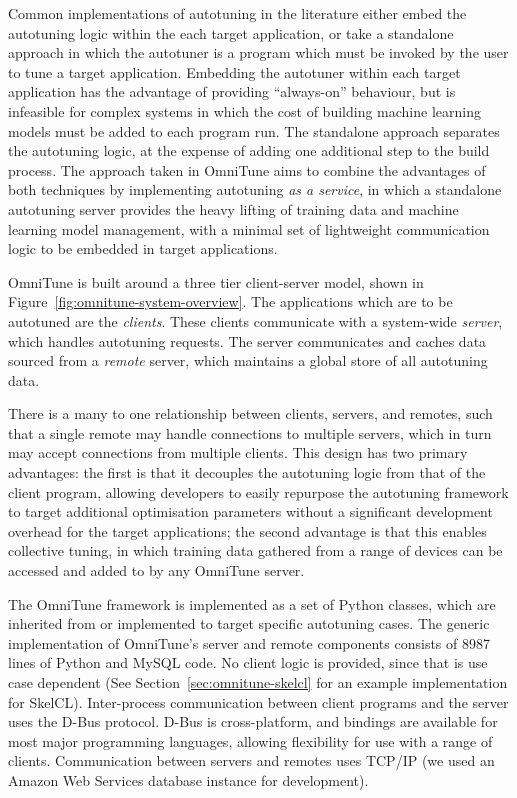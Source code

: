 \documentclass[nonatbib,preprint,9pt]{sigplanconf}
\begin{document}
Common implementations of autotuning in the literature either embed
the autotuning logic within the each target application, or take a
standalone approach in which the autotuner is a program which must be
invoked by the user to tune a target application. Embedding the
autotuner within each target application has the advantage of
providing ``always-on'' behaviour, but is infeasible for complex
systems in which the cost of building machine learning models must be
added to each program run. The standalone approach separates the
autotuning logic, at the expense of adding one additional step to the
build process. The approach taken in OmniTune aims to combine the
advantages of both techniques by implementing autotuning \emph{as a
  service}, in which a standalone autotuning server provides the heavy
lifting of training data and machine learning model management, with a
minimal set of lightweight communication logic to be embedded in
target applications.

OmniTune is built around a three tier client-server model, shown in
Figure~\ref{fig:omnitune-system-overview}. The applications which are
to be autotuned are the \emph{clients}. These clients communicate with
a system-wide \emph{server}, which handles autotuning requests. The
server communicates and caches data sourced from a \emph{remote}
server, which maintains a global store of all autotuning data.

There is a many to one relationship between clients, servers, and
remotes, such that a single remote may handle connections to multiple
servers, which in turn may accept connections from multiple
clients. This design has two primary advantages: the first is that it
decouples the autotuning logic from that of the client program,
allowing developers to easily repurpose the autotuning framework to
target additional optimisation parameters without a significant
development overhead for the target applications; the second advantage
is that this enables collective tuning, in which training data
gathered from a range of devices can be accessed and added to by any
OmniTune server.

The OmniTune framework is implemented as a set of Python classes,
which are inherited from or implemented to target specific autotuning
cases. The generic implementation of OmniTune's server and remote
components consists of 8987 lines of Python and MySQL code. No client
logic is provided, since that is use case dependent (See
Section~\ref{sec:omnitune-skelcl} for an example implementation for
SkelCL). Inter-process communication between client programs and the
server uses the D-Bus protocol. D-Bus is cross-platform, and bindings
are available for most major programming languages, allowing
flexibility for use with a range of clients. Communication between
servers and remotes uses TCP/IP (we used an Amazon Web Services
database instance for development).
\end{document}

